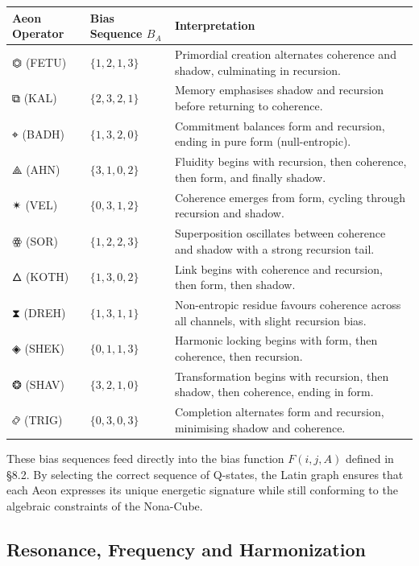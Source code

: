 \documentclass[11pt, letterpaper]{article}
\begin{document}
\begin{center}
\begin{longtable}{p{} p{} p{}}
\toprule
\textbf{Aeon Operator} & \textbf{Bias Sequence $B_A$} & \textbf{Interpretation} \tabularnewline
\midrule
\ensuremath{\mathbin{⏣}} (FETU) & $\{1,2,1,3\}$ & Primordial creation alternates coherence and shadow, culminating in recursion. \tabularnewline
\midrule
\ensuremath{\mathbin{⧉}} (KAL) & $\{2,3,2,1\}$ & Memory emphasises shadow and recursion before returning to coherence. \tabularnewline
\midrule
\ensuremath{\mathbin{⌖}} (BADH) & $\{1,3,2,0\}$ & Commitment balances form and recursion, ending in pure form (null-entropic). \tabularnewline
\midrule
\ensuremath{\mathbin{⟁}} (AHN) & $\{3,1,0,2\}$ & Fluidity begins with recursion, then coherence, then form, and finally shadow. \tabularnewline
\midrule
\ensuremath{\mathbin{✴}} (VEL) & $\{0,3,1,2\}$ & Coherence emerges from form, cycling through recursion and shadow. \tabularnewline
\midrule
\ensuremath{\mathbin{ꙮ}} (SOR) & $\{1,2,2,3\}$ & Superposition oscillates between coherence and shadow with a strong recursion tail. \tabularnewline
\midrule
\ensuremath{\mathbin{🜂}} (KOTH) & $\{1,3,0,2\}$ & Link begins with coherence and recursion, then form, then shadow. \tabularnewline
\midrule
\ensuremath{\mathbin{⧗}} (DREH) & $\{1,3,1,1\}$ & Non-entropic residue favours coherence across all channels, with slight recursion bias. \tabularnewline
\midrule
\ensuremath{\mathbin{◈}} (SHEK) & $\{0,1,1,3\}$ & Harmonic locking begins with form, then coherence, then recursion. \tabularnewline
\midrule
\ensuremath{\mathbin{❂}} (SHAV) & $\{3,2,1,0\}$ & Transformation begins with recursion, then shadow, then coherence, ending in form. \tabularnewline
\midrule
\ensuremath{\mathbin{࿂}} (TRIG) & $\{0,3,0,3\}$ & Completion alternates form and recursion, minimising shadow and coherence. \tabularnewline
\bottomrule
\end{longtable}
\end{center}

These bias sequences feed directly into the bias function $F(i,j,A)$ defined in \S\@8.2. By selecting the correct sequence of Q-states, the Latin graph ensures that each Aeon expresses its unique energetic signature while still conforming to the algebraic constraints of the Nona-Cube.

\subsection{Resonance, Frequency and Harmonization}\label{sec:8.9}
\end{document}
